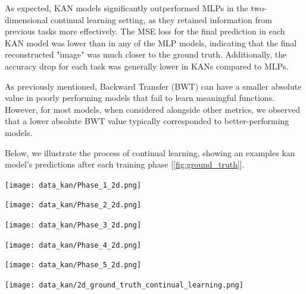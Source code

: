 \documentclass[conference]{IEEEtran}
\begin{document}
\raggedright

As expected, KAN models significantly outperformed MLPs in the two-dimensional
continual learning setting, as they retained information from previous tasks
more effectively. The MSE loss for the final prediction in each KAN model was
lower than in any of the MLP models, indicating that the final reconstructed
"image" was much closer to the ground truth. Additionally, the accuracy drop
for each task was generally lower in KANs compared to MLPs.

As previously mentioned, Backward Transfer (BWT) can have a smaller absolute
value in poorly performing models that fail to learn meaningful functions.
However, for most models, when considered alongside other metrics, we observed
that a lower absolute BWT value typically corresponded to better-performing
models.

Below, we illustrate the process of continual learning, showing an examples kan
model's predictions after each training phase [\ref{fig:ground_truth}].

\begin{minipage}{0.32\linewidth}
    \centering
    \texttt{[image: data\_kan/Phase\_1\_2d.png]}
    \label{fig:phase1}
\end{minipage}
\hfill
\begin{minipage}{0.32\linewidth}
    \centering
    \texttt{[image: data\_kan/Phase\_2\_2d.png]}
    \label{fig:phase2}
\end{minipage}
\hfill
\begin{minipage}{0.32\linewidth}
    \centering
    \texttt{[image: data\_kan/Phase\_3\_2d.png]}
    \label{fig:phase3}
\end{minipage}

\vspace{0.5cm} %

\begin{minipage}{0.32\linewidth}
    \centering
    \texttt{[image: data\_kan/Phase\_4\_2d.png]}
    \label{fig:phase4}
\end{minipage}
\hfill
\begin{minipage}{0.32\linewidth}
    \centering
    \texttt{[image: data\_kan/Phase\_5\_2d.png]}
    \label{fig:phase5}
\end{minipage}
\hfill
\begin{minipage}{0.32\linewidth}
    \centering
    \texttt{[image: data\_kan/2d\_ground\_truth\_continual\_learning.png]}
    \label{fig:ground_truth}
\end{minipage}
\end{document}
